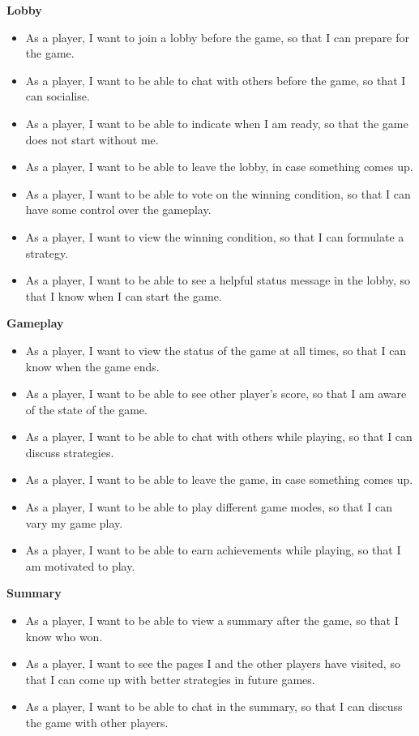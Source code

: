 \documentclass{l4proj}
\begin{document}
\textbf{Lobby}
\begin{itemize}
    \item As a player, I want to join a lobby before the game, so that I can prepare for the game.
    \item As a player, I want to be able to chat with others before the game, so that I can socialise.
    \item As a player, I want to be able to indicate when I am ready, so that the game does not start without me.
    \item As a player, I want to be able to leave the lobby, in case something comes up.
    \item As a player, I want to be able to vote on the winning condition, so that I can have some control over the gameplay.
    \item As a player, I want to view the winning condition, so that I can formulate a strategy.
    \item As a player, I want to be able to see a helpful status message in the lobby, so that I know when I can start the game.
\end{itemize}

\textbf{Gameplay}
\begin{itemize}
    \item As a player, I want to view the status of the game at all times, so that I can know when the game ends.
    \item As a player, I want to be able to see other player's score, so that I am aware of the state of the game.
    \item As a player, I want to be able to chat with others while playing, so that I can discuss strategies.
    \item As a player, I want to be able to leave the game, in case something comes up.
    \item As a player, I want to be able to play different game modes, so that I can vary my game play.
    \item As a player, I want to be able to earn achievements while playing, so that I am motivated to play.
\end{itemize}

\textbf{Summary}
\begin{itemize}
    \item As a player, I want to be able to view a summary after the game, so that I know who won.
    \item As a player, I want to see the pages I and the other players have visited, so that I can come up with better strategies in future games.
    \item As a player, I want to be able to chat in the summary, so that I can discuss the game with other players.
\end{itemize}
\end{document}
